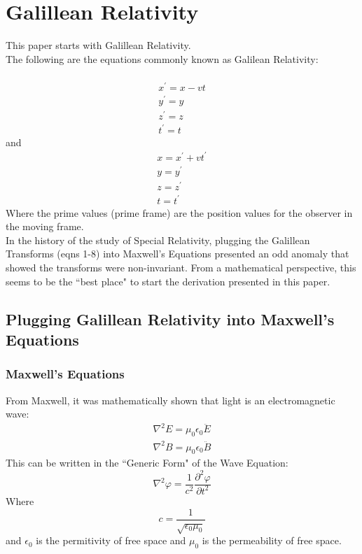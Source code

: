\documentclass[journal]{IEEEtran}
\begin{document}
\section{Galillean Relativity}
This paper starts with Galillean Relativity.\\
The following are the equations commonly known as Galilean
Relativity:\\\\
\begin{eqnarray}
x^\prime = x-vt\\
y^\prime = y\\
z^\prime = z\\
t^\prime = t
\end{eqnarray}
and
\begin{eqnarray}
x = x^\prime+vt^{\prime}\\
y = y^\prime\\
z = z^\prime\\
t = t^\prime
\end{eqnarray}
Where the prime values (prime frame) are the position values for the
observer in the moving frame.\\
In the history of the study of Special Relativity, plugging the
Galillean Transforms (eqns 1-8) into Maxwell's Equations presented an
odd anomaly that showed the transforms were non-invariant.  From a
mathematical perspective, this seems to be the ``best place" to start
the derivation presented in this paper.
\subsection{Plugging Galillean Relativity into Maxwell's Equations}
\subsubsection{Maxwell's Equations}
From Maxwell, it was mathematically shown that light is an
electromagnetic wave:
\begin{eqnarray}
\nabla^2E=\mu_0\epsilon_0\ddot{E}\\
\nabla^2B=\mu_0\epsilon_0\ddot{B}
\end{eqnarray}
This can be written in the ``Generic Form" of the Wave Equation:
\begin{equation}
\nabla^2\varphi=\frac{1}{c^2}\frac{\partial^2 \varphi}{\partial t^2}
\end{equation}
Where
\begin{equation}
c = \frac{1}{\sqrt{\epsilon_0\mu_0}}
\end{equation}
and $\epsilon_0$ is the
permitivity of free space and $\mu_0$ is the permeability of free
space.
\end{document}
